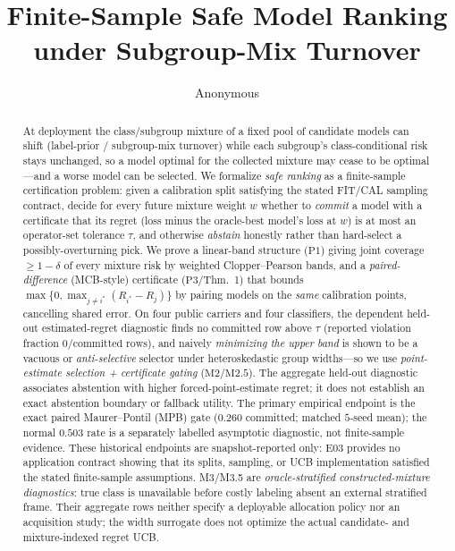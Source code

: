 \documentclass{article}
\title{Finite-Sample Safe Model Ranking under Subgroup-Mix Turnover}
\author{Anonymous}
\date{}
\begin{document}
\maketitle

\begin{abstract}
At deployment the class/subgroup mixture of a fixed pool of candidate models can shift
(label-prior / subgroup-mix turnover) while each subgroup's class-conditional risk stays
unchanged, so a model optimal for the collected mixture may cease to be optimal---and a
worse model can be selected. We formalize \emph{safe ranking} as a finite-sample
 certification problem: given a calibration split satisfying the stated FIT/CAL sampling
 contract, decide for every future mixture weight $w$
whether to \emph{commit} a model with a certificate that its regret (loss minus the
oracle-best model's loss at $w$) is at most an operator-set tolerance $\tau$, and otherwise
\emph{abstain} honestly rather than hard-select a possibly-overturning pick. We prove a
linear-band structure ($\mathrm{P1}$) giving joint coverage $\ge1-\delta$ of every mixture
risk by weighted Clopper--Pearson bands, and a \emph{paired-difference} (MCB-style)
certificate ($\mathrm{P3}$/Thm.~1) that bounds $\max\{0,\max_{j\ne i^*}(R_{i^*}-R_j)\}$ by pairing models on the
\emph{same} calibration points, cancelling shared error. On four public carriers and four
classifiers, the dependent held-out estimated-regret diagnostic finds no committed row above
$\tau$ (reported violation fraction $0/\text{committed rows}$), and
naively \emph{minimizing the upper band} is shown to be a vacuous or \emph{anti-selective}
selector under heteroskedastic group widths---so we use \emph{point-estimate selection +
 certificate gating} ($\mathrm{M2}$/$\mathrm{M2.5}$). The aggregate held-out diagnostic associates
 abstention with higher forced-point-estimate regret; it does not establish an exact abstention
 boundary or fallback utility. The primary empirical endpoint is the exact paired
 Maurer--Pontil (MPB) gate ($0.260$ committed; matched $5$-seed mean); the normal $0.503$ rate is
 a separately labelled asymptotic diagnostic, not finite-sample evidence. These historical
 endpoints are snapshot-reported only: E03 provides no application contract showing that its
 splits, sampling, or UCB implementation satisfied the stated finite-sample assumptions.
M3/M3.5 are \emph{oracle-stratified constructed-mixture diagnostics}: true class is unavailable
before costly labeling absent an external stratified frame. Their aggregate rows neither specify a
deployable allocation policy nor an acquisition study; the width surrogate does not optimize the
actual candidate- and mixture-indexed regret UCB.
\end{abstract}
\end{document}
